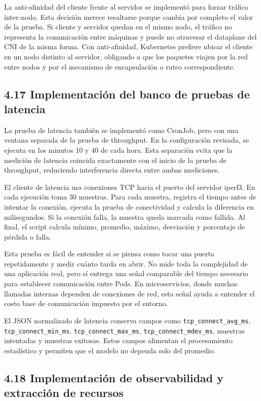 \documentclass[journal]{IEEEtran}
\begin{document}
La anti-afinidad del cliente frente al servidor se implementó para forzar tráfico inter-nodo. Esta decisión merece resaltarse porque cambia por completo el valor de la prueba. Si cliente y servidor quedan en el mismo nodo, el tráfico no representa la comunicación entre máquinas y puede no atravesar el dataplane del CNI de la misma forma. Con anti-afinidad, Kubernetes prefiere ubicar el cliente en un nodo distinto al servidor, obligando a que los paquetes viajen por la red entre nodos y por el mecanismo de encapsulación o ruteo correspondiente.

\subsection{4.17 Implementación del banco de pruebas de latencia}

La prueba de latencia también se implementó como CronJob, pero con una ventana separada de la prueba de throughput. En la configuración revisada, se ejecuta en los minutos 10 y 40 de cada hora. Esta separación evita que la medición de latencia coincida exactamente con el inicio de la prueba de throughput, reduciendo interferencia directa entre ambas mediciones.

El cliente de latencia usa conexiones TCP hacia el puerto del servidor iperf3. En cada ejecución toma 30 muestras. Para cada muestra, registra el tiempo antes de intentar la conexión, ejecuta la prueba de conectividad y calcula la diferencia en milisegundos. Si la conexión falla, la muestra queda marcada como fallida. Al final, el script calcula mínimo, promedio, máximo, desviación y porcentaje de pérdida o falla.

Esta prueba es fácil de entender si se piensa como tocar una puerta repetidamente y medir cuánto tarda en abrir. No mide toda la complejidad de una aplicación real, pero sí entrega una señal comparable del tiempo necesario para establecer comunicación entre Pods. En microservicios, donde muchas llamadas internas dependen de conexiones de red, esta señal ayuda a entender el costo base de comunicación impuesto por el entorno.

El JSON normalizado de latencia conserva campos como \texttt{tcp\_connect\_avg\_ms}, \texttt{tcp\_connect\_min\_ms}, \texttt{tcp\_connect\_max\_ms}, \texttt{tcp\_connect\_mdev\_ms}, muestras intentadas y muestras exitosas. Estos campos alimentan el procesamiento estadístico y permiten que el modelo no dependa solo del promedio.

\subsection{4.18 Implementación de observabilidad y extracción de recursos}
\end{document}
